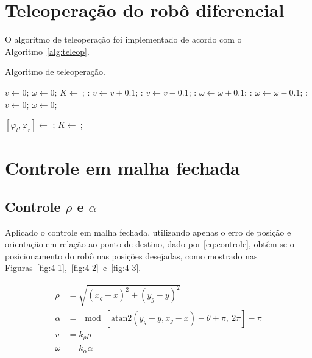 \section{Teleoperação do robô diferencial}

O algoritmo de teleoperação foi implementado de acordo com  o Algoritmo~\autoref{alg:teleop}.
\begin{algorithm}
	\caption{Algoritmo de teleoperação.}\label{alg:teleop}
	\begin{algorithmic}[1]
		\State $v \gets 0$;
		\State $\omega \gets 0$;
		\State $K \gets  \ $;
				:
				\State $v \gets v+0.1$;
				\EndCase
				:
				 \State $v \gets v-0.1$;
				\EndCase
				:
				\State $\omega \gets \omega+0.1$;
				\EndCase
				:
				\State $\omega \gets \omega-0.1$;
				\EndCase
				:
				\State $v \gets 0$;
				\State $\omega \gets 0$;
				\EndCase
			\EndSwitch
			
			\State $[\varphi_l, \varphi_r] \gets $ ;
			\State  {}
			\State $K \gets  \ $;
			
		\EndWhile
	\end{algorithmic}
\end{algorithm}




\section{Controle em malha fechada}

\subsection{Controle $\rho$ e $\alpha$}

Aplicado o controle em malha fechada, utilizando apenas o erro de posição e orientação em relação ao ponto de destino, dado por \eqref{eq:controle}, obtêm-se o posicionamento do robô nas posições desejadas, como mostrado nas Figuras~\ref{fig:4-1},~\ref{fig:4-2}~e~\ref{fig:4-3}.

\begin{equation}\label{eq:controle}
	\begin{split}
		\rho &= \sqrt{(x_g-x)^2 + (y_g-y)^2} \\
		\alpha& = \mod \left[\text{atan2}\left(y_g-y,x_g-x\right) - \theta + \pi, \ 2\pi \right] -\pi \\
		v &= k_\rho\rho \\
		\omega &= k_\alpha\alpha
	\end{split}
\end{equation}

